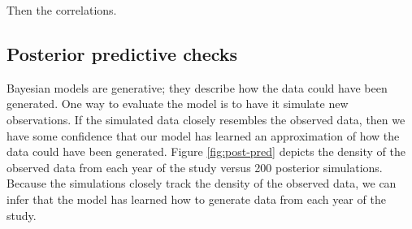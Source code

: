\documentclass [11pt, proquest] {uwthesis}[2015/03/03]
\begin{document}
Then the correlations.

\subsection{Posterior predictive
checks}\label{posterior-predictive-checks}

Bayesian models are generative; they describe how the data could have
been generated. One way to evaluate the model is to have it simulate new
observations. If the simulated data closely resembles the observed data,
then we have some confidence that our model has learned an approximation
of how the data could have been generated. Figure \ref{fig:post-pred}
depicts the density of the observed data from each year of the study
versus 200 posterior simulations. Because the simulations closely track
the density of the observed data, we can infer that the model has
learned how to generate data from each year of the study.
\end{document}
